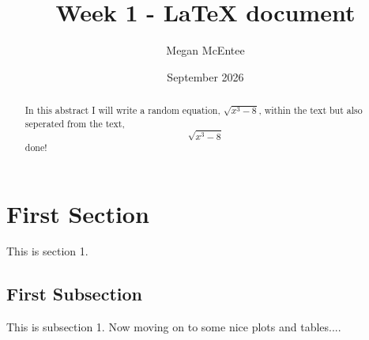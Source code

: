 \documentclass[10pt, letterpaper]{article}
\title{Week 1 - LaTeX document}
\author{Megan McEntee}
\date{September 2026}
\begin{document}
\maketitle
\begin{abstract}

In this abstract I will write a random equation, \(\sqrt{x^3-8}\), within the text 
but also seperated from the text,
\[\sqrt{x^3-8}\]
done!

\end{abstract}

\section{First Section}
This is section 1.

\subsection{First Subsection}
This is subsection 1. Now moving on to some nice plots and tables....
\end{document}
